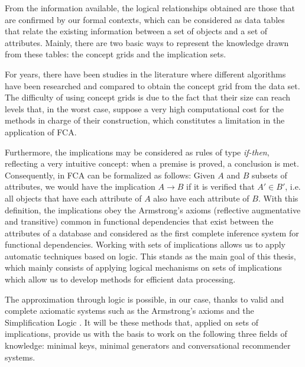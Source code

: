 From the information available, the logical relationships obtained are those that are confirmed by our formal contexts, which can be considered as data tables that relate the existing information between a set of objects and a set of attributes. Mainly, there are two basic ways to represent the knowledge drawn from these tables: the concept grids and the implication sets.

For years, there have been studies in the literature \cite{Kuznetsov2002} where different algorithms have been researched and compared to obtain the concept grid from the data set. The difficulty of using concept grids is due to the fact that their size can reach levels that, in the worst case, suppose a very high computational cost for the methods in charge of their construction, which constitutes a limitation in the application of FCA.

Furthermore, the implications may be considered as rules of type \textit{if-then}, reflecting a very intuitive concept: when a premise is proved, a conclusion is met. Consequently, in FCA can be formalized as follows: Given $A$ and $B$ subsets of attributes, we would have the implication $A \rightarrow B$ if it is verified that $A' \in B'$, i.e. all objects that have each attribute of $A$ also have each attribute of $B$. With this definition, the implications obey the Armstrong's axioms \cite{Armstrong74} (reflective augmentative and transitive) common in functional dependencies that exist between the attributes of a database and considered as the first complete inference system for functional dependencies. Working with sets of implications allows us to apply automatic techniques based on logic. This stands as the main goal of this thesis, which mainly consists of applying logical mechanisms on sets of implications which allow us to develop methods for efficient data processing.

The approximation through logic is possible, in our case, thanks to valid and complete axiomatic systems such as the Armstrong's axioms \cite{Armstrong74} and the Simplification Logic \cite{Mora2004}. It will be these methods that, applied on sets of implications, provide us with the basis to work on the following three fields of knowledge: minimal keys, minimal generators and conversational recommender systems.


